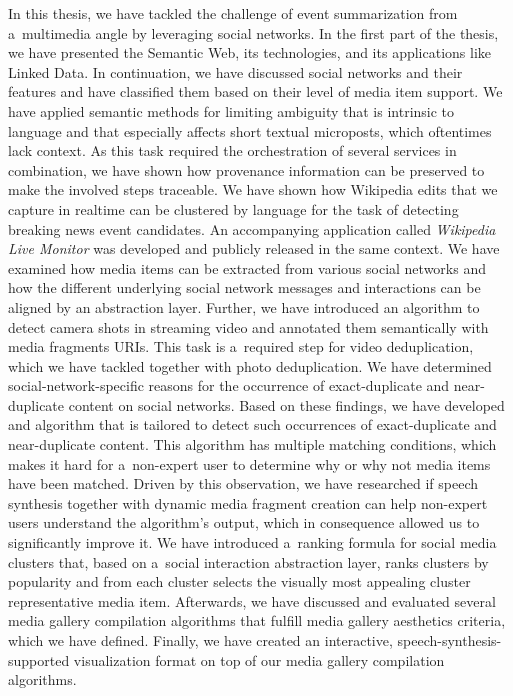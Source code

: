In this thesis, we have tackled the challenge of event summarization
from a~multimedia angle by leveraging social networks.
In the first part of the thesis,
we have presented the Semantic Web,
its technologies, and its applications like Linked Data.
In continuation, we have discussed social networks
and their features and have classified them
based on their level of media item support.
We have applied semantic methods for limiting ambiguity
that is intrinsic to language and that especially affects
short textual microposts, which oftentimes lack context.
As this task required the orchestration of several services
in combination, we have shown how provenance information
can be preserved to make the involved steps traceable.
We have shown how Wikipedia edits
that we capture in realtime can be clustered by language
for the task of detecting breaking news event candidates.
An accompanying application called \emph{Wikipedia Live Monitor}
was developed and publicly released in the same context.
We have examined how media items can be extracted from
various social networks and how the different
underlying social network messages and interactions
can be aligned by an abstraction layer.
Further, we have introduced an algorithm
to detect camera shots in streaming video and
annotated them semantically with media fragments URIs.
This task is a~required step for video deduplication,
which we have tackled together with photo deduplication.
We have determined social-network-specific reasons
for the occurrence of exact-duplicate and near-duplicate content
on social networks.
Based on these findings, we have developed and algorithm
that is tailored to detect such occurrences of exact-duplicate
and near-duplicate content.
This algorithm has multiple matching conditions,
which makes it hard for a~non-expert user to determine
why or why not media items have been matched.
Driven by this observation, we have researched
if speech synthesis together with dynamic media fragment creation
can help non-expert users understand the algorithm's output,
which in consequence allowed us to significantly improve it.
We have introduced a~ranking formula for social media clusters
that, based on a~social interaction abstraction layer,
ranks clusters by popularity and from each cluster selects
the visually most appealing cluster representative media item.
Afterwards, we have discussed and evaluated several
media gallery compilation algorithms
that fulfill media gallery aesthetics criteria,
which we have defined.
Finally, we have created an interactive,
speech-synthesis-supported visualization format
on top of our media gallery compilation algorithms.

